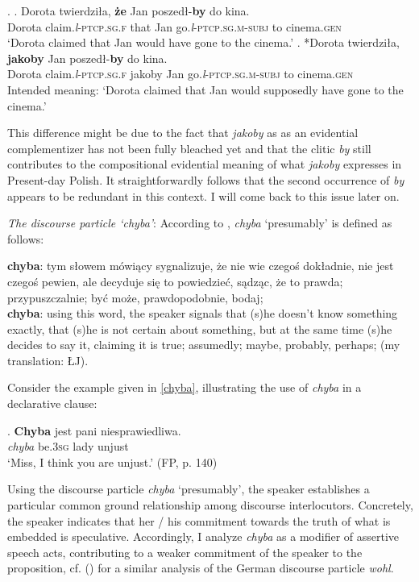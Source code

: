 \documentclass[output=paper
,modfonts
,nonflat]{langsci/langscibook}
\newcommand{\glossformat}[1]{\textsc{#1}}
\newcommand{\thirdperson}{\glossformat{3}\xspace}
\newcommand{\fem}{\glossformat{f}\xspace}
\newcommand{\gen}{\glossformat{gen}\xspace}
\newcommand{\lptcp}{\emph{l}\glossformat{-ptcp}\xspace}
\newcommand{\masc}{\glossformat{m}\xspace}
\newcommand{\sg}{\glossformat{sg}\xspace}
\newcommand{\subj}{\glossformat{subj}\xspace}
\newcommand{\nquelle}[1]{\newline\phantom{x}\hfill(#1)}
\begin{document}
 \ex.	\ag.	Dorota twierdziła, \textbf{że} Jan poszedł-\textbf{by} do kina. \\
 		Dorota claim.{\lptcp}.{\sg}.{\fem} that Jan go.{\lptcp}.{\sg}.{\masc}-{\subj} to cinema.{\gen} \\
		`Dorota claimed that Jan would have gone to the cinema.' 
	\bg.	*Dorota twierdziła, \textbf{jakoby} Jan poszedł-\textbf{by} do kina. \\
 		Dorota claim.{\lptcp}.{\sg}.{\fem} jakoby Jan go.{\lptcp}.{\sg}.{\masc}-{\subj} to cinema.{\gen} \\
		Intended meaning: `Dorota claimed that Jan would supposedly have gone to the cinema.' 	

This difference might be due to the fact that \emph{jakoby} as as an evidential complementizer has not been fully bleached yet and that the clitic \emph{by} still contributes to the compositional evidential meaning of what \emph{jakoby} expresses in Present-day Polish. It straightforwardly follows that the second occurrence of \emph{by} appears to be redundant in this context. I will come back to this issue later on. 

\emph{The discourse particle `chyba'}: According to \textcite{SWJP1998}, \emph{chyba} `presumably' is defined as follows:

\begin{displayquote}
\textbf{chyba}: tym słowem mówiący sygnalizuje, że nie wie czegoś dokładnie, nie jest czegoś pewien, ale decyduje się to powiedzieć, sądząc, że to prawda; przypuszczalnie; być może, prawdopodobnie, bodaj; \\ \textbf{chyba}: using this word, the speaker signals that (s)he doesn't know something exactly, that (s)he is not certain about something, but at the same time (s)he decides to say it, claiming it is true; assumedly; maybe, probably, perhaps;  (my translation: ŁJ).  \newline \textcite[117]{SWJP1998}
\end{displayquote}

\noindent Consider the example given in \ref{chyba}, illustrating the use of \emph{chyba} in a declarative clause:

\exg.		\textbf{Chyba} jest pani niesprawiedliwa. \label{chyba} \\
		\emph{chyba} be.{\thirdperson}{\sg} lady unjust \\
		`Miss, I think you are unjust.' \nquelle{FP, p. 140}

Using the discourse particle \emph{chyba} `presumably', the speaker establishes a particular common ground relationship among discourse interlocutors. Concretely, the speaker indicates that her / his commitment towards the truth of what is embedded is speculative. Accordingly, I analyze \emph{chyba} as a modifier of assertive speech acts, contributing to a weaker commitment of the speaker to the proposition, cf. \citeauthor{Zimmermann2004} (\citeyear{Zimmermann2004, Zimmermann2011a})  for a similar analysis of the German discourse particle \emph{wohl}.
\end{document}
